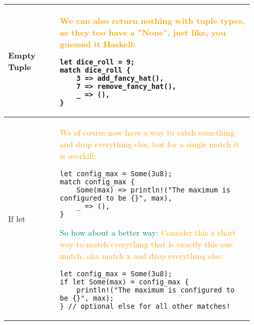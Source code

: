 \documentclass[main.tex,fontsize=8pt,paper=a4,paper=portrait,DIV=calc,]{scrartcl}
\begin{document}
\begin{table}[ht!]
\begin{tabular}{|m{0.2\linewidth}|m{0.755\linewidth}|}
\hline
Empty Tuple & 
\textcolor{orange}{We can also return nothing with tuple types, as they too have a "None", just like, you guessed it Haskell:}\newline
\begin{lstlisting}
let dice_roll = 9;
match dice_roll {
    3 => add_fancy_hat(),
    7 => remove_fancy_hat(),
    _ => (),
}
\end{lstlisting}\\
\hline
If let &
\textcolor{orange}{We of course now have a way to catch something and drop everything else, \newline
but for a single match it is overkill:}\newline
\begin{lstlisting}
let config_max = Some(3u8);
match config_max {
    Some(max) => println!("The maximum is configured to be {}", max),
    _ => (),
}
\end{lstlisting}
\textcolor{teal}{So how about a better way:}\newline
\textcolor{orange}{Consider this a short way to match everything that is exactly this one match, \newline
aka match x and drop everything else:}\newline
\begin{lstlisting}
let config_max = Some(3u8);
if let Some(max) = config_max {
    println!("The maximum is configured to be {}", max);
} // optional else for all other matches!
\end{lstlisting}\\
\hline
\end{tabular}

\end{table}
\end{document}
